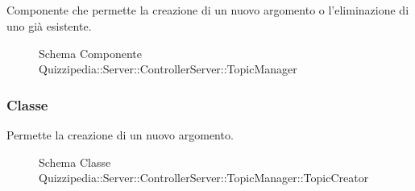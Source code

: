 \subsection{}
Componente che permette la creazione di un nuovo argomento o l'eliminazione di uno già esistente.
\begin{figure}[H]
\centering
\noindent{}
\caption[Schema Componente Quizzipedia::Server::ControllerServer::TopicManager]{Schema Componente Quizzipedia::Server::ControllerServer::TopicManager}
\end{figure}
\subsubsection{Classe }
Permette la creazione di un nuovo argomento.
\begin{figure}[H]
\centering
\noindent{}
\caption[Schema Classe TopicCreator]{Schema Classe Quizzipedia::Server::ControllerServer::TopicManager::TopicCreator}
\end{figure}
